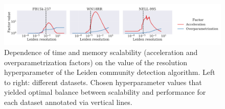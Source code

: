 \begin{figure}[H]
\begin{center}
\includegraphics[width=\textwidth]{figures/coins/scalability_leiden_resolution}
\end{center}
\caption[Dependence of time and memory scalability on the value of the resolution hyperparameter of the Leiden community detection algorithm.]{Dependence of time and memory scalability (acceleration and overparametrization factors) on the value of the resolution hyperparameter of the Leiden community detection algorithm. Left to right: different datasets. Chosen hyperparameter values that yielded optimal balance between scalability and performance for each dataset annotated via vertical lines.}
\label{fig:scalability_resolution}
\end{figure}





